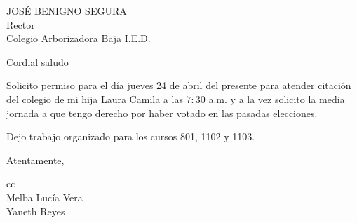 \documentclass[letterpaper,spanish,11pt]{letter}
\begin{document}
\begin{letter}{JOSÉ BENIGNO SEGURA\\Rector\\Colegio Arborizadora Baja I.E.D.}
	
\opening{Cordial saludo}
Solicito permiso para el día jueves 24 de abril del presente para atender citación del colegio de mi hija Laura Camila a las $7:30$ a.m. y a la vez solicito la media jornada a que tengo derecho por haber votado en las pasadas elecciones.

Dejo trabajo organizado para los cursos 801, 1102 y 1103.
\closing{Atentamente,}

cc{\\Melba Lucía Vera\\Yaneth Reyes}

\end{letter}
\end{document}

